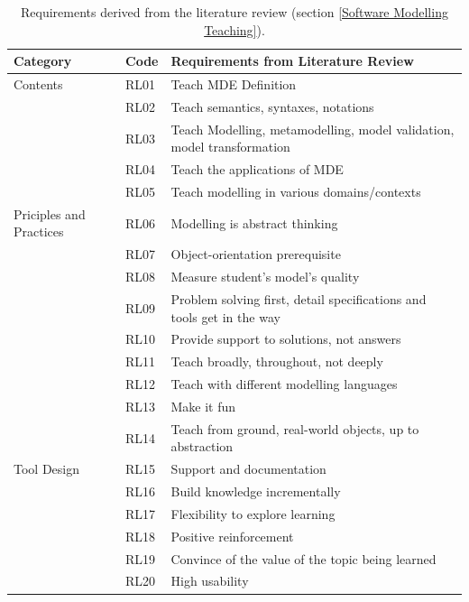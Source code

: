 \documentclass[12pt, a4paper]{report} \usepackage[titletoc]{appendix}
\begin{document}
\begin{table}[ht]\caption{Requirements derived from the literature review (section \ref{Software Modelling Teaching}).}
\label{table:requirements}
\begin{center}
\begin{tabular}{ p{2cm}p{1cm}p{10cm} } 
\hline
Category & Code & Requirements from Literature Review \\
\hline
\multirow{1}{2cm}{Contents} 
& RL01 & Teach MDE Definition \\ 
& RL02 & Teach semantics, syntaxes, notations \\ 
& RL03 & Teach Modelling, metamodelling, model validation, model transformation\\
& RL04 & Teach the applications of MDE \\
& RL05 & Teach modelling in various domains/contexts \\

\hline
\multirow{1}{2cm}{Priciples and Practices} 
& RL06 & Modelling is abstract thinking \\ 
& RL07 & Object-orientation prerequisite \\
& RL08 & Measure student's model's quality \\
& RL09 & Problem solving first, detail specifications and tools get in the way \\
& RL10 & Provide support to solutions, not answers \\ 
& RL11 & Teach broadly, throughout, not deeply \\
& RL12 & Teach with different modelling languages \\ 
& RL13 & Make it fun \\ 
& RL14 & Teach from ground, real-world objects, up to abstraction \\ 

\hline
\multirow{1}{2cm}{Tool Design}
& RL15 & Support and documentation \\
& RL16 & Build knowledge incrementally \\
& RL17 & Flexibility to explore learning \\
& RL18 & Positive reinforcement \\
& RL19 & Convince of the value of the topic being learned \\ 
& RL20 & High usability \\ 
\hline
\end{tabular}
\end{center}
\end{table}
 
\end{document}
